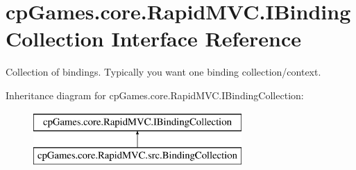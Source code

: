 \hypertarget{interfacecp_games_1_1core_1_1_rapid_m_v_c_1_1_i_binding_collection}{}\section{cp\+Games.\+core.\+Rapid\+M\+V\+C.\+I\+Binding\+Collection Interface Reference}
\label{interfacecp_games_1_1core_1_1_rapid_m_v_c_1_1_i_binding_collection}


Collection of bindings. Typically you want one binding collection/context.  


Inheritance diagram for cp\+Games.\+core.\+Rapid\+M\+V\+C.\+I\+Binding\+Collection\+:\begin{figure}[H]
\begin{center}
\leavevmode
\includegraphics[height=2.000000cm]{interfacecp_games_1_1core_1_1_rapid_m_v_c_1_1_i_binding_collection}
\end{center}
\end{figure}
